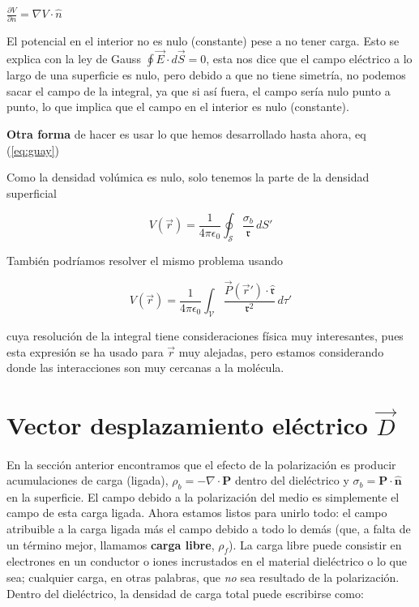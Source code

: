 \documentclass[12pt,a4paper]{report}
\newcommand{\esp}{\vspace{0.5cm}}
\begin{document}
	\begin{nota}
		$\frac{\partial V}{\partial n} = \nabla V \cdot \hat{n}$
	\end{nota}
	
	\esp
	
	\begin{importante}
		El potencial en el interior no es nulo (constante) pese a no tener carga. Esto se explica con la ley de Gauss $\oint \vec{E} \cdot d\vec{S} = 0$, esta nos dice que el campo eléctrico a lo largo de una superficie es nulo, pero debido a que no tiene simetría, no podemos sacar el campo de la integral, ya que si así fuera, el campo sería nulo punto a punto, lo que implica que el campo en el interior es nulo (constante).
	\end{importante}
	
	\esp
	
	\noindent \textbf{Otra forma} de hacer es usar lo que hemos desarrollado hasta ahora, eq (\ref{eq:guay})
	
	\esp
	
	Como la densidad volúmica es nulo, solo tenemos la parte de la densidad superficial
	
	\begin{equation}
		V(\vec{r}) = \frac{1}{4\pi\epsilon_0} \oint_{\mathcal{S}} \frac{\sigma_b}{\mathfrak{r}} \, dS'
	\end{equation}
	
	\esp
	
	\noindent También podríamos resolver el mismo problema usando 

	\esp

	\begin{equation}
		V(\vec{r}) = \frac{1}{4\pi\epsilon_0} \int_{\mathcal{V}} \frac{\vec{P}(\vec{r}') \cdot \hat{\mathfrak{r}}}{\mathfrak{r}^2} \, d\tau'
	\end{equation}

	\esp
	
	cuya resolución de la integral tiene consideraciones física muy interesantes, pues esta expresión se ha usado para $\vec{r}$ muy alejadas, pero estamos considerando donde las interacciones son muy cercanas a la molécula.

	\section{Vector desplazamiento eléctrico $\vec{D}$}
	
	En la sección anterior encontramos que el efecto de la polarización es producir acumulaciones de carga (ligada), $\rho_b = -\nabla \cdot \mathbf{P}$ dentro del dieléctrico y $\sigma_b = \mathbf{P} \cdot \hat{\mathbf{n}}$ en la superficie. El campo debido a la polarización del medio es simplemente el campo de esta carga ligada. Ahora estamos listos para unirlo todo: el campo atribuible a la carga ligada más el campo debido a todo lo demás (que, a falta de un término mejor, llamamos \textbf{carga libre}, $\rho_f$). La carga libre puede consistir en electrones en un conductor o iones incrustados en el material dieléctrico o lo que sea; cualquier carga, en otras palabras, que \textit{no} sea resultado de la polarización. Dentro del dieléctrico, la densidad de carga total puede escribirse como:
	
\end{document}
